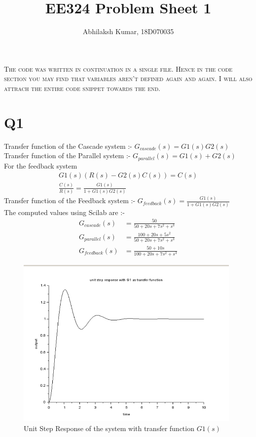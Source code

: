 \documentclass[10pt]{article}
\title{EE324 Problem Sheet 1}
\author{Abhilaksh Kumar, 18D070035}
\begin{document}
\maketitle
\textsc{The code was written in continuation in a single file. Hence in the code section you may find that variables aren't defined again and again. I will also attrach the entire code snippet towards the end.}
\section*{Q1}
Transfer function of the Cascade system :- $G_{cascade}(s) = G1(s)G2(s)$\\
Transfer function of the Parallel system :- $G_{parallel}(s) = G1(s) + G2(s)$\\
For the feedback system
\begin{align*}
    G1(s)(R(s) - G2(s)C(s)) = C(s)\\
    \frac{C(s)}{R(s)} = \frac{G1(s)}{1 + G1(s)G2(s)}
\end{align*}
Transfer function of the Feedback system :- $G_{feedback}(s) = \frac{G1(s)}{1 + G1(s)G2(s)}$\\
The computed values using Scilab are :-
\begin{align}
    G_{cascade}(s) &= \frac{50}{ 50 +20s +7s^2 +s^3 }\\         
    G_{parallel}(s) &= \frac{100 +20s +5s^2}{50 +20s +7s^2 +s^3}\\
    G_{feedback}(s) &= \frac{50 +10s}{100 +20s +7s^2 +s^3}
\end{align}
\begin{figure}[H]
    \centering
    \includegraphics[width=0.98\textwidth]{transfer_function.png}
    \caption{Unit Step Response of the system with transfer function $G1(s)$}
    \label{fig:my_label}
\end{figure}
\end{document}
